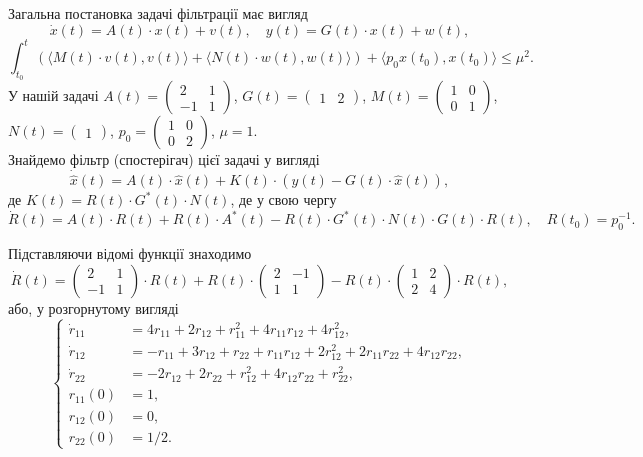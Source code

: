 \begin{solution}
	Загальна постановка задачі фільтрації має вигляд \[ \dot x (t)= A (t) \cdot x (t)+ v (t), \quad y (t)= G (t) \cdot x(t) + w(t),\] \[\int_{t_0}^t ( \langle M(t) \cdot v(t), v(t)\rangle + \langle N(t) \cdot w(t), w(t)\rangle )  + \langle p_0 x(t_0), x(t_0) \rangle \le \mu^2. \] У нашій задачі $A (t) = \begin{pmatrix} 2 & 1 \\ -1 & 1 \end{pmatrix}$, $G (t)= \begin{pmatrix} 1 & 2 \end{pmatrix}$, $M (t)= \begin{pmatrix} 1 & 0 \\ 0 & 1 \end{pmatrix}$, $N (t)= \begin{pmatrix} 1 \end{pmatrix}$, $p_0 = \begin{pmatrix} 1 & 0 \\ 0 & 2 \end{pmatrix}$, $\mu = 1$. \\

	Знайдемо фільтр (спостерігач) цієї задачі у вигляді \[ \dot{\hat{x}} (t) = A (t) \cdot \hat x (t) + K (t) \cdot (y (t) - G (t) \cdot \hat x (t)), \] де $K (t)= R (t) \cdot G^* (t) \cdot N(t)$, де у свою чергу \[\dot R (t)= A (t) \cdot R (t)+ R (t) \cdot A^* (t)- R (t) \cdot G^* (t) \cdot N (t) \cdot G (t) \cdot R(t), \quad R(t_0) = p_0^{-1}. \]

 	Підставляючи відомі функції знаходимо \[\dot R (t) = \begin{pmatrix} 2 & 1 \\ -1 & 1 \end{pmatrix} \cdot R(t) + R(t) \cdot \begin{pmatrix} 2 & -1 \\ 1 & 1 \end{pmatrix} - R(t) \cdot \begin{pmatrix} 1 & 2 \\ 2 & 4 \end{pmatrix} \cdot R(t), \] або, у розгорнутому вигляді \[ \left\{ \begin{aligned}
 		\dot r_{11} &= 4 r_{11} + 2 r_{12} + r_{11}^2 + 4 r_{11}r_{12} + 4 r_{12}^2, \\
 		\dot r_{12} &=  - r_{11} + 3 r_{12} + r_{22} + r_{11}r_{12}+2r_{12}^2+2r_{11}r_{22}+4r_{12}r_{22}, \\
 		\dot r_{22} &= - 2 r_{12} + 2 r_{22} + r_{12}^2 + 4 r_{12} r_{22} + r_{22}^2, \\
 		r_{11} (0) &= 1, \\
 		r_{12} (0) &= 0, \\
 		r_{22} (0) &= 1 / 2.
	\end{aligned} \right. \] 	


\end{solution}
